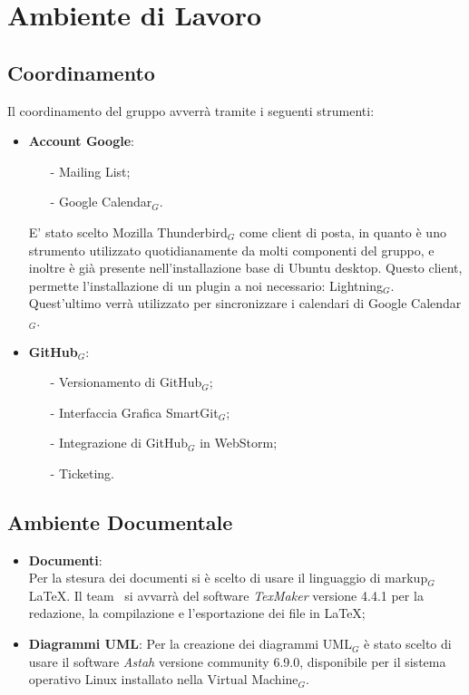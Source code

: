 \section{Ambiente di Lavoro}
\subsection{Coordinamento}
Il coordinamento del gruppo avverrà tramite i seguenti strumenti:
\begin{itemize}
	\item \textbf{Account Google}:
	\begin{itemize}
		\item[-] Mailing List;
		\item[-] Google Calendar$_G$.
	\end{itemize}
	E' stato scelto Mozilla Thunderbird$_G$ come client di posta, in quanto è uno strumento utilizzato quotidianamente da molti componenti del gruppo, e inoltre è già presente nell'installazione base di Ubuntu desktop. Questo client, permette l'installazione di un plugin a noi necessario: Lightning$_G$. Quest'ultimo verrà utilizzato per sincronizzare i calendari di Google Calendar$_G$.
	\item \textbf{GitHub$_G$}:
	\begin{itemize}
		\item[-] Versionamento di GitHub$_G$;
		\item[-] Interfaccia Grafica SmartGit$_G$;
		\item[-] Integrazione di GitHub$_G$ in WebStorm;
		\item[-] Ticketing.
	\end{itemize}
\end{itemize}
\subsection{Ambiente Documentale}
\begin{itemize}
	\item \textbf{Documenti}:\\
	Per la stesura dei documenti si è scelto di usare il linguaggio di markup$_G$ \LaTeX. Il team \gruppo\ si avvarrà del software \textit{TexMaker} versione 4.4.1 per la redazione, la compilazione e l'esportazione dei file in \LaTeX;
	\item \textbf{Diagrammi UML}:
	Per la creazione dei diagrammi UML$_G$ è stato scelto di usare il software \textit{Astah} versione community 6.9.0, disponibile per il sistema operativo Linux installato nella Virtual Machine$_G$.
\end{itemize}
